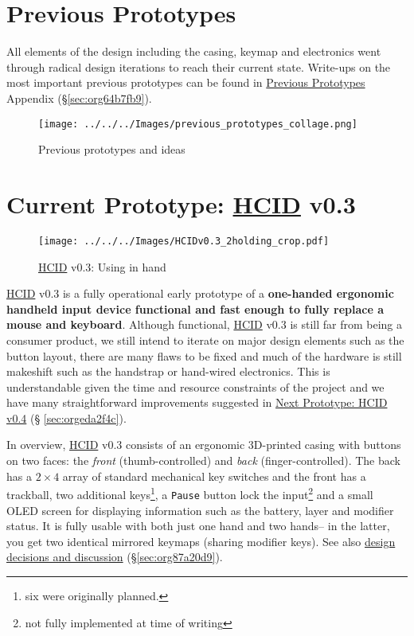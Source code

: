 \documentclass[logo,bsc,singlespacing,parskip]{infthesis}
\begin{document}
\chapter{Previous Prototypes}
\label{sec:org23c1072}
All elements of the design including the casing, keymap and electronics went through radical design iterations to reach their current state.
Write-ups on the most important previous prototypes can be found in \hyperref[sec:org64b7fb9]{Previous Prototypes}  Appendix (\S \ref{sec:org64b7fb9}).

\begin{figure}[h]
\centering
\texttt{[image: ../../../Images/previous\_prototypes\_collage.png]}
\caption{Previous prototypes and ideas}
\end{figure}

\chapter{Current Prototype: \hyperref[org30e2275]{HCID} v0.3}
\label{sec:org208909f}
\begin{figure}[h]
\centering
\texttt{[image: ../../../Images/HCIDv0.3\_2holding\_crop.pdf]}
\caption{\hyperref[org30e2275]{HCID} v0.3: Using in hand}
\end{figure}

\hyperref[org30e2275]{HCID} v0.3 is a fully operational early prototype of a \textbf{one-handed ergonomic handheld input device functional and fast enough to fully replace a mouse and keyboard}.
Although functional, \hyperref[org30e2275]{HCID} v0.3 is still far from being a consumer product, we still intend to iterate on major design elements such as the button layout, there are many flaws to be fixed and much of the hardware is still makeshift such as the handstrap or hand-wired electronics.
This is understandable given the time and resource constraints of the project and we have many straightforward improvements suggested in \hyperref[sec:orgeda2f4c]{Next Prototype: HCID v0.4}  (§ \ref{sec:orgeda2f4c}).

In overview, \hyperref[org30e2275]{HCID} v0.3 consists of an ergonomic 3D-printed casing with buttons on two faces: the \emph{front} (thumb-controlled) and \emph{back} (finger-controlled).
The back has a \(2\times4\) array of standard mechanical key switches and the front has a trackball, two additional keys\footnote{six were originally planned.}, a \texttt{Pause} button lock the input\footnote{not fully implemented at time of writing} and a small OLED screen for displaying information such as the battery, layer and modifier status.
It is fully usable with both just one hand and two hands-- in the latter, you get two identical mirrored keymaps (sharing modifier keys).
See also \hyperref[sec:org87a20d9]{design decisions and discussion} (\S \ref{sec:org87a20d9}).
\end{document}
